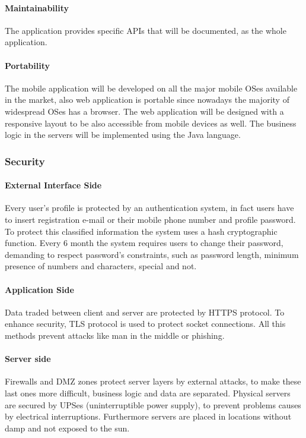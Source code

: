 \documentclass[a4paper,12pt,dvipsnames]{article}%
\begin{document}
\paragraph{Maintainability} The application provides specific APIs that will be documented, as the whole application.
\paragraph{Portability} The mobile application will be developed on all the major mobile OSes available in the market, also web application is portable since nowadays the majority of widespread OSes has a browser. The web application will be designed with a responsive layout to be also accessible from mobile devices as well. The business logic in the servers will be implemented using the Java language.
\subsubsection{Security}
\paragraph{External Interface Side}
Every user's profile is protected by an authentication system, in fact users have to insert registration e-mail or their mobile phone number and profile password. To protect this classified information the system uses a hash cryptographic function. Every 6 month the system requires users to change their password, demanding to respect password's constraints, such as password length, minimum presence of numbers and characters, special and not.
\paragraph{Application Side}
Data traded between client and server are protected by HTTPS protocol. To enhance security, TLS protocol is used to protect socket connections. All this methods prevent attacks like man in the middle or phishing.
\paragraph{Server side}
Firewalls and DMZ zones protect server layers by external attacks, to make these last ones more difficult, business logic and data are separated. Physical servers are secured by UPSes (uninterruptible power supply), to prevent problems causes by electrical interruptions. Furthermore servers are placed in locations without damp and not exposed to the sun.
\newpage
\end{document}
